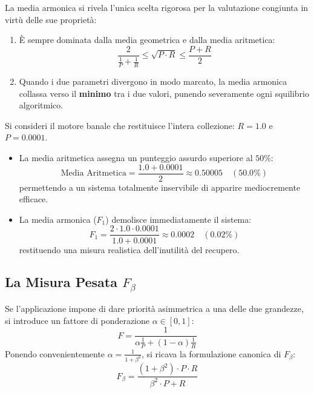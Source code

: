 \begin{property}
La media armonica si rivela l'unica scelta rigorosa per la valutazione congiunta in virtù delle sue propriet\`a:
\begin{enumerate}
    \item \`E sempre dominata dalla media geometrica e dalla media aritmetica:
    \begin{equation}
    \frac{2}{\frac{1}{P} + \frac{1}{R}} \le \sqrt{P \cdot R} \le \frac{P + R}{2}
    \end{equation}
    \item Quando i due parametri divergono in modo marcato, la media armonica collassa verso il \textbf{minimo} tra i due valori, punendo severamente ogni squilibrio algoritmico.
\end{enumerate}
\end{property}

\begin{example}
Si consideri il motore banale che restituisce l'intera collezione: $R = 1.0$ e $P = 0.0001$.
\begin{itemize}
    \item La media aritmetica assegna un punteggio assurdo superiore al $50\%$:
    \begin{equation}
    \text{Media Aritmetica} = \frac{1.0 + 0.0001}{2} \approx 0.50005 \quad (50.0\%)
    \end{equation}
    permettendo a un sistema totalmente inservibile di apparire mediocremente efficace.
    \item La media armonica ($F_1$) demolisce immediatamente il sistema:
    \begin{equation}
    F_1 = \frac{2 \cdot 1.0 \cdot 0.0001}{1.0 + 0.0001} \approx 0.0002 \quad (0.02\%)
    \end{equation}
    restituendo una misura realistica dell'inutilit\`a del recupero.
\end{itemize}
\end{example}

\FloatBarrier
\subsection{La Misura Pesata $F_\beta$}
\label{subsec:f-beta-pesata}

Se l'applicazione impone di dare priorit\`a asimmetrica a una delle due grandezze, si introduce un fattore di ponderazione $\alpha \in [0, 1]$:
\begin{equation}
F = \frac{1}{\alpha \frac{1}{P} + (1 - \alpha) \frac{1}{R}}
\end{equation}
Ponendo convenientemente $\alpha = \frac{1}{1 + \beta^2}$, si ricava la formulazione canonica di \textbf{$F_\beta$}:
\begin{equation}
F_\beta = \frac{(1 + \beta^2) \cdot P \cdot R}{\beta^2 \cdot P + R}
\end{equation}

